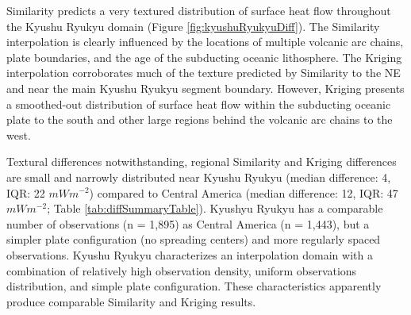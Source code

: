 Similarity predicts a very textured distribution of surface heat flow throughout the Kyushu Ryukyu domain (Figure \ref{fig:kyushuRyukyuDiff}). The Similarity interpolation is clearly influenced by the locations of multiple volcanic arc chains, plate boundaries, and the age of the subducting oceanic lithosphere. The Kriging interpolation corroborates much of the texture predicted by Similarity to the NE and near the main Kyushu Ryukyu segment boundary. However, Kriging presents a smoothed-out distribution of surface heat flow within the subducting oceanic plate to the south and other large regions behind the volcanic arc chains to the west.

Textural differences notwithstanding, regional Similarity and Kriging differences are small and narrowly distributed near Kyushu Ryukyu (median difference: 4, IQR: 22 \(mWm^{-2}\)) compared to Central America (median difference: 12, IQR: 47 \(mWm^{-2}\); Table \ref{tab:diffSummaryTable}). Kyushyu Ryukyu has a comparable number of observations (n = 1,895) as Central America (n = 1,443), but a simpler plate configuration (no spreading centers) and more regularly spaced observations. Kyushu Ryukyu characterizes an interpolation domain with a combination of relatively high observation density, uniform observations distribution, and simple plate configuration. These characteristics apparently produce comparable Similarity and Kriging results.



